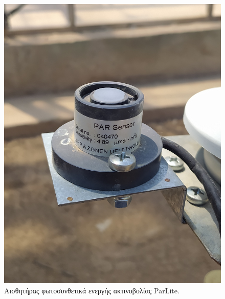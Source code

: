 \documentclass[12pt, a4paper]{report} %
\newcommand{\english}{\foreignlanguage{english}}
\begin{document}
\begin{figure}[ht]%
    \centering
    \includegraphics[scale=0.09]{Figures/parlite.jpg}
    \caption{Αισθητήρας φωτοσυνθετικά ενεργής ακτινοβολίας \english{ParLite}.}
    \label{fig_parlite}
\end{figure}

\end{document}
